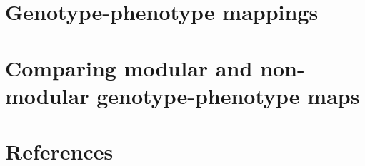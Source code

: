 

%

\newtoggle{thmsty}
\togglefalse{thmsty}

\newtoggle{longpres}
\togglefalse{longpres}









	\begin{frame}
		\titlepage
	\end{frame}



	\section[GP maps]{Genotype-phenotype mappings}
	





	\section[PD comp]{Comparing modular and non-modular genotype-phenotype maps}
	

	
	
	

	\section{References}
	


